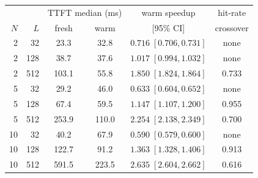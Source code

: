 \begin{tabular}{rrcccc}
\toprule
 & & \multicolumn{2}{c}{TTFT median (ms)} & warm speedup & hit-rate \\
$N$ & $L$ & fresh & warm & [95\% CI] & crossover \\
\midrule
2 & 32 & 23.3 & 32.8 & $0.716\;[0.706, 0.731]$ & none \\
2 & 128 & 38.7 & 37.6 & $1.017\;[0.994, 1.032]$ & none \\
2 & 512 & 103.1 & 55.8 & $1.850\;[1.824, 1.864]$ & 0.733 \\
5 & 32 & 29.2 & 46.0 & $0.633\;[0.604, 0.652]$ & none \\
5 & 128 & 67.4 & 59.5 & $1.147\;[1.107, 1.200]$ & 0.955 \\
5 & 512 & 253.9 & 110.0 & $2.254\;[2.138, 2.349]$ & 0.700 \\
10 & 32 & 40.2 & 67.9 & $0.590\;[0.579, 0.600]$ & none \\
10 & 128 & 122.7 & 91.2 & $1.363\;[1.328, 1.406]$ & 0.913 \\
10 & 512 & 591.5 & 223.5 & $2.635\;[2.604, 2.662]$ & 0.616 \\
\bottomrule
\end{tabular}

